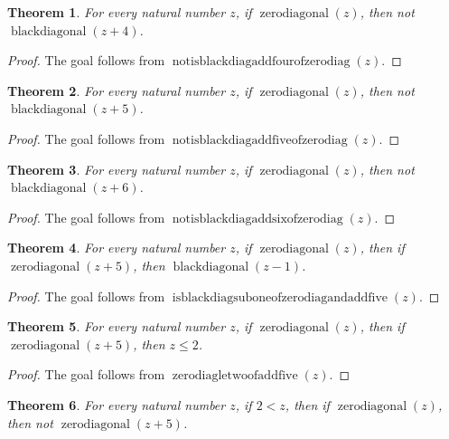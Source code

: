 \documentclass[11pt]{article}
\newtheorem{theorem}{Theorem}[section]
\theoremstyle{definition}
\begin{document}
\begin{theorem}
\label{ll:paper:not-isblackdiag-add-four-of-zero-diag}
For every natural number \(z\), if \(\operatorname{zerodiagonal}(z)\), then not \(\operatorname{blackdiagonal}(z + 4)\).
\end{theorem}
\begin{proof}
The goal follows from \(\operatorname{notisblackdiagaddfourofzerodiag}(z)\).
\end{proof}
\begin{theorem}
\label{ll:paper:not-isblackdiag-add-five-of-zero-diag}
For every natural number \(z\), if \(\operatorname{zerodiagonal}(z)\), then not \(\operatorname{blackdiagonal}(z + 5)\).
\end{theorem}
\begin{proof}
The goal follows from \(\operatorname{notisblackdiagaddfiveofzerodiag}(z)\).
\end{proof}
\begin{theorem}
\label{ll:paper:not-isblackdiag-add-six-of-zero-diag}
For every natural number \(z\), if \(\operatorname{zerodiagonal}(z)\), then not \(\operatorname{blackdiagonal}(z + 6)\).
\end{theorem}
\begin{proof}
The goal follows from \(\operatorname{notisblackdiagaddsixofzerodiag}(z)\).
\end{proof}
\begin{theorem}
\label{ll:paper:isblackdiag-sub-one-of-zero-diag-and-add-five}
For every natural number \(z\), if \(\operatorname{zerodiagonal}(z)\), then if \(\operatorname{zerodiagonal}(z + 5)\), then \(\operatorname{blackdiagonal}(z - 1)\).
\end{theorem}
\begin{proof}
The goal follows from \(\operatorname{isblackdiagsuboneofzerodiagandaddfive}(z)\).
\end{proof}
\begin{theorem}
\label{ll:paper:zero-diag-le-two-of-add-five}
For every natural number \(z\), if \(\operatorname{zerodiagonal}(z)\), then if \(\operatorname{zerodiagonal}(z + 5)\), then \(z \le 2\).
\end{theorem}
\begin{proof}
The goal follows from \(\operatorname{zerodiagletwoofaddfive}(z)\).
\end{proof}
\begin{theorem}
\label{ll:paper:not-iszerodiag-add-five-of-gt-two}
For every natural number \(z\), if \(2 < z\), then if \(\operatorname{zerodiagonal}(z)\), then not \(\operatorname{zerodiagonal}(z + 5)\).
\end{theorem}
\end{document}
